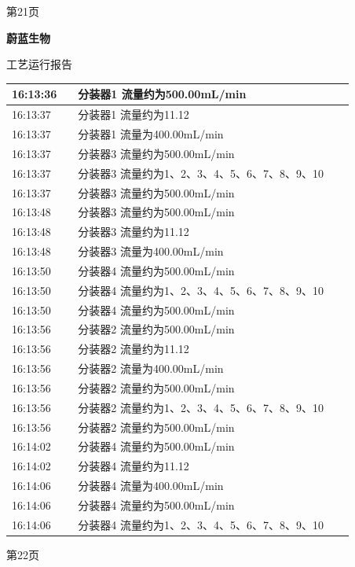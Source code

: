 \documentclass[UTF8,10pt,a4paper,fontset=fandol]{ctexart}
\begin{document}
\begin{center}
\begin{minipage}[t]{0.47\linewidth}
\vspace{0.4em}
第21页
\end{minipage}
\hfill
\begin{minipage}[t]{0.47\linewidth}
\centering
\textbf{蔚蓝生物}

\vspace{0.2em}
工艺运行报告

\vspace{0.3em}
\begin{tabular}{|p{0.18\linewidth}|p{0.75\linewidth}|}
\hline
16:13:36 & 分装器1 流量约为500.00mL/min \\ \hline
16:13:37 & 分装器1 流量约为11.12 \\ \hline
16:13:37 & 分装器1 流量为400.00mL/min \\ \hline
16:13:37 & 分装器3 流量约为500.00mL/min \\ \hline
16:13:37 & 分装器3 流量约为1、2、3、4、5、6、7、8、9、10 \\ \hline
16:13:37 & 分装器3 流量约为500.00mL/min \\ \hline
16:13:48 & 分装器3 流量约为500.00mL/min \\ \hline
16:13:48 & 分装器3 流量约为11.12 \\ \hline
16:13:48 & 分装器3 流量为400.00mL/min \\ \hline
16:13:50 & 分装器4 流量约为500.00mL/min \\ \hline
16:13:50 & 分装器4 流量约为1、2、3、4、5、6、7、8、9、10 \\ \hline
16:13:50 & 分装器4 流量约为500.00mL/min \\ \hline
16:13:56 & 分装器2 流量约为500.00mL/min \\ \hline
16:13:56 & 分装器2 流量约为11.12 \\ \hline
16:13:56 & 分装器2 流量为400.00mL/min \\ \hline
16:13:56 & 分装器2 流量约为500.00mL/min \\ \hline
16:13:56 & 分装器2 流量约为1、2、3、4、5、6、7、8、9、10 \\ \hline
16:13:56 & 分装器2 流量约为500.00mL/min \\ \hline
16:14:02 & 分装器4 流量约为500.00mL/min \\ \hline
16:14:02 & 分装器4 流量约为11.12 \\ \hline
16:14:06 & 分装器4 流量为400.00mL/min \\ \hline
16:14:06 & 分装器4 流量约为500.00mL/min \\ \hline
16:14:06 & 分装器4 流量约为1、2、3、4、5、6、7、8、9、10 \\ \hline
\end{tabular}

\vspace{0.4em}
第22页
\end{minipage}
\end{center}
\end{document}
